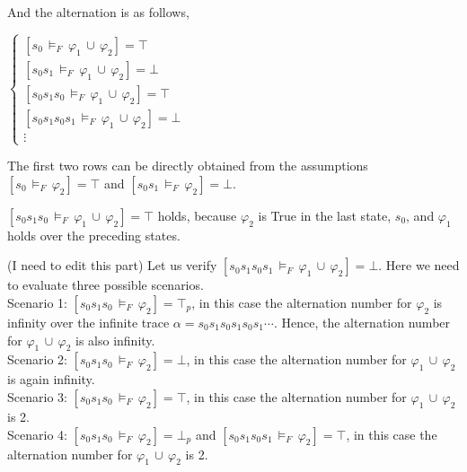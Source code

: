 And the alternation is as follows,

 \begin{center}
$
  \left.
  \begin{cases}
    [s_0 \, \models_F \, \varphi_1 \, \cup \, \varphi_2] = \top \\
    [s_0 s_1 \, \models_F \, \varphi_1 \, \cup \, \varphi_2] = \bot \\
    [s_0 s_1 s_0 \, \models_F \, \varphi_1 \, \cup \, \varphi_2] = \top \\
    [s_0 s_1 s_0 s_1 \, \models_F \, \varphi_1 \, \cup \, \varphi_2] = \bot \\
    \vdots
  \end{cases}
  \right. 
$
\end{center}

The first two rows can be directly obtained from the assumptions $[s_0 \, \models_F \, \varphi_2] = \top$ and $[s_0s_1 \, 
\models_F \, \varphi_2] = \bot$. 

$[s_0 s_1 s_0 \, \models_F \, \varphi_1 \, \cup \, \varphi_2] = \top$ holds, because $\varphi_2$ is True in the last state, $s_0$, and $\varphi_1$ holds over the preceding states. 

(I need to edit this part) Let us verify $[s_0 s_1 s_0 s_1 \, \models_F \, \varphi_1 \, \cup \, \varphi_2] = \bot$. Here we need to evaluate three possible scenarios. \\
Scenario 1: $[s_0 s_1 s_0 \, \models_F \, \varphi_2] = \top_p$, in this case the alternation number for $\varphi_2$ is infinity over the infinite trace $\alpha = s_0s_1s_0s_1s_0s_1 \cdots$. Hence, the alternation number for $ \varphi_1 \, \cup \, \varphi_2$  is also infinity. \\ Scenario 2: $[s_0 s_1 s_0 \, \models_F \, \varphi_2] = \bot$, in this case the alternation number for $ \varphi_1 \, \cup \, \varphi_2$ is again infinity. \\ Scenario 3: $[s_0 s_1 s_0 \, \models_F \, \varphi_2] = \top$, in this case the alternation number for $ \varphi_1 \, \cup \, \varphi_2$ is 2. \\ Scenario 4: $[s_0 s_1 s_0 \, \models_F \, \varphi_2] = \bot_p$ and $[s_0 s_1 s_0 s_1 \, \models_F \, \varphi_2] = \top$, in this case the alternation number for $ \varphi_1 \, \cup \, \varphi_2$ is 2.











